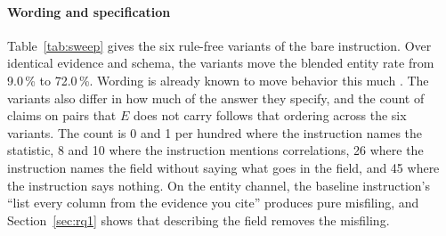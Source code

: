 \documentclass[smallextended,natbib]{svjour3}
\begin{document}
\begin{table}[!tp]
\caption{Rule-free instruction variants, $N=100$ each, \texttt{deepseek-chat},
run on 2026-09-15,
ordered by the blended entity rate, the share of responses with any entity
violation. \emph{Outside E} is a name $E$ does not carry (18 of the 20 are the
word \texttt{target}, which neither $E$ nor the frame contains; the frame's
target column is \texttt{y\_true}); \emph{misf.} is a name in $E$ that is not
a column; \emph{misq.} is a wrong number on a pair $E$ carries; \emph{unver.}
is a pair $E$ does not carry. \emph{Statistic specified} is what the
instruction says about the claim's statistic.}
\label{tab:sweep}
\centering
{}
\end{table}

\paragraph{Wording and specification}
Table~\ref{tab:sweep} gives the six rule-free variants of the bare
instruction. Over identical evidence and schema, the variants move the blended
entity rate from 9.0\,\% to 72.0\,\%. Wording is already known to move
behavior this much \citep{sclar2024formatspread}. The variants also differ in
how much of the answer they specify, and the count of claims on pairs that
$E$ does not carry follows that ordering across the six variants. The count is
0 and 1 per hundred where the instruction names the statistic, 8 and 10 where
the instruction mentions correlations, 26 where the instruction names the
field without saying what goes in the field, and 45 where the instruction says
nothing. On the entity channel, the baseline instruction's ``list every column
from the evidence you cite'' produces pure misfiling, and
Section~\ref{sec:rq1} shows that describing the field removes the misfiling.
\end{document}
